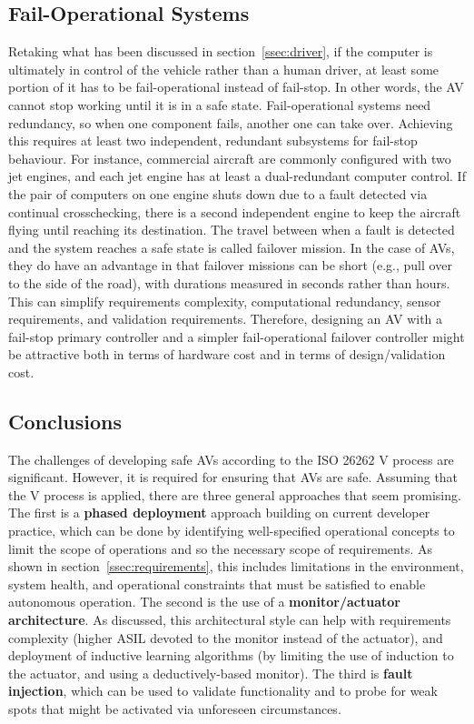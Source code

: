 \documentclass[a4paper, 10pt]{article}
\begin{document}
\subsection{Fail-Operational Systems}
Retaking what has been discussed in section~\ref{ssec:driver}, if the computer is ultimately in control of the vehicle rather than a human driver, at least some portion of it has to be fail-operational instead of fail-stop. In other words, the AV cannot stop working until it is in a safe state. Fail-operational systems need redundancy, so when one component fails, another one can take over. Achieving this requires at least two independent, redundant subsystems for fail-stop behaviour. For instance, commercial aircraft are commonly configured with two jet engines, and each jet engine has at least a dual-redundant computer control. If the pair of computers on one engine shuts down due to a fault detected via continual crosschecking, there is a second independent engine to keep the aircraft flying until reaching its destination. The travel between when a fault is detected and the system reaches a safe state is called failover mission. In the case of AVs, they do have an advantage in that failover missions can be short (e.g., pull over to the side of the road), with durations measured in seconds rather than hours. This can simplify requirements complexity, computational redundancy, sensor requirements, and validation requirements. Therefore, designing an AV with a fail-stop primary controller and a simpler fail-operational failover controller might be attractive both in terms of hardware cost and in terms of design/validation cost.

\subsection{Conclusions}
The challenges of developing safe AVs according to the ISO 26262 V process are significant. However, it is required for ensuring that AVs are safe. Assuming that the V process is applied, there are three general approaches that seem promising. The first is a \textbf{phased deployment} approach building on current developer practice, which can be done by identifying well-specified operational concepts to limit the scope of operations and so the necessary scope of requirements. As shown in section~\ref{ssec:requirements}, this includes limitations in the environment, system health, and operational constraints that must be satisfied to enable autonomous operation. The second is the use of a \textbf{monitor/actuator architecture}. As discussed, this architectural style can help with requirements complexity (higher ASIL devoted to the monitor instead of the actuator), and deployment of inductive learning algorithms (by limiting the use of induction to the actuator, and using a deductively-based monitor). The third is \textbf{fault injection}, which can be used to validate functionality and  to probe for weak spots that might be activated via unforeseen circumstances.
\end{document}
